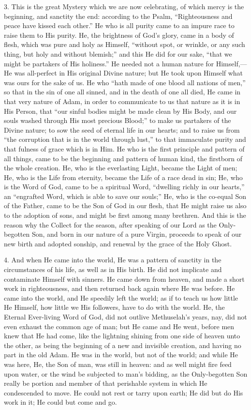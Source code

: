 3. This is the great Mystery which we are now celebrating, of which
mercy is the beginning, and sanctity the end: according to the Psalm,
``Righteousness and peace have kissed each other.'' He who is
all purity came to an impure race to raise them to His purity. He, the
brightness of God's glory, came in a body of flesh, which was pure and
holy as Himself, ``without spot, or wrinkle, or any such thing,
but holy and without blemish;'' and this He did for our sake,
``that we might be partakers of His holiness.'' He needed not
a human nature for Himself,—He was all-perfect in His original
Divine nature; but He took upon Himself what was ours for the sake of
us. He who ``hath made of one blood all nations of men,'' so
that in the sin of one all sinned, and in the death of one all died,
He came in that very nature of Adam, in order to communicate to us
that nature as it is in His Person, that ``our sinful bodies might
be made clean by His Body, and our souls washed through His most
precious Blood;'' to make us partakers of the Divine nature; to
sow the seed of eternal life in our hearts; and to raise us from
``the corruption that is in the world through lust,'' to that
immaculate purity and that fulness of grace which is in Him. He who is
the first principle and pattern of all things, came to be the
beginning and pattern of human kind, the firstborn of the whole
creation. He, who is the everlasting Light, became the Light of men;
He, who is the Life from eternity, became the Life of a race dead in
sin; He, who is the Word of God, came to be a spiritual Word,
``dwelling richly in our hearts,'' an ``engrafted Word,
which is able to save our souls;'' He, who is the co-equal Son of
the Father, came to be the Son of God in our flesh, that He might
raise us also to the adoption of sons, and might be first among many
brethren. And this is the reason why the Collect for the season, after
speaking of our Lord as the Only-begotten Son, and born in our nature
of a pure Virgin, proceeds to speak of our new birth and adopted
sonship, and renewal by the grace of the Holy Ghost.

4. And when He came into the world, He was a pattern of sanctity in
the circumstances of his life, as well as in His birth. He did not
implicate and contaminate Himself with sinners. He came down from
heaven, and made a short work in righteousness, and then returned back
again where He was before. He came into the world, and He speedily
left the world; as if to teach us how little He Himself, how little we
His followers, have to do with the world. He, the Eternal Ever-living
Word of God, did not outlive Methuselah's years, nay, did not even
exhaust the common age of man; but He came and He went, before men
knew that He had come, like the lightning shining from one side of
heaven unto the other, as being the beginning of a new and invisible
creation, and having no part in the old Adam. He was in the world, but
not of the world; and while He was here, He, the Son of man, was still
in heaven: and as well might fire feed upon water, or the wind be
subjected to man's bidding, as the Only-begotten Son really be portion
and member of that perishable system in which He condescended to move.
He could not rest or tarry upon earth; He did but do His work in it;
He could but come and go.

